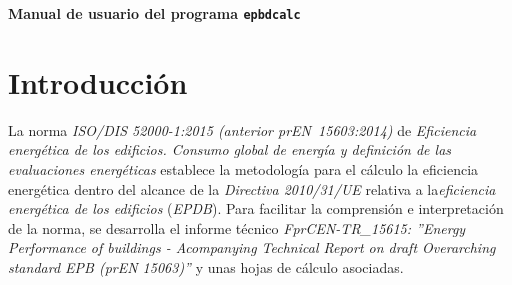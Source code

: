 \documentclass[10pt,notitlepage,oneside,a4paper]{article}
\newcommand{\titulo}{Manual de usuario del programa \texttt{epbdcalc}}
\newcommand{\subtitulo}{Cálculo de la eficiencia energética según la norma ISO/DIS 52000-1:2015}
\begin{document}
\thispagestyle{portada}
\null\vspace{5cm}
\begin{center}
{\Large \bfseries \titulo}
\vskip 0pt\vspace{0.5cm}{\large \subtitulo}
\end{center}

\null\vfill
\begin{center} \footnotesize


%

\end{center}
\vskip 0pt\vspace{1.5cm}
\clearpage

\newpage
\tableofcontents
\clearpage

\newpage
\section{Introducción}

La norma \textit{ISO/DIS 52000-1:2015 (anterior prEN~15603:2014)} de \textit{Eficiencia energética de los edificios. Consumo global de energía y definición de las evaluaciones energéticas} establece la metodología para el cálculo la eficiencia energética dentro del alcance de la \textit{Directiva 2010/31/UE} relativa a la\textit{eficiencia energética de los edificios} (\textit{EPDB}). Para facilitar la comprensión e interpretación de la norma, se desarrolla el informe técnico \textit{FprCEN-TR\_15615: ''Energy Performance of buildings - Acompanying Technical Report on draft Overarching standard EPB (prEN 15063)''} y unas hojas de cálculo asociadas.
\end{document}
